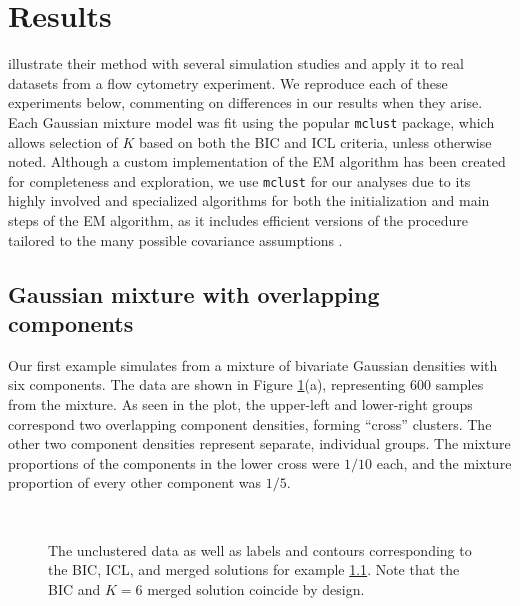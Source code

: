 \documentclass{uwstat572}
\renewcommand\;{\,}
\begin{document}
\section{Results}
\cite{Baudry10} illustrate their method with several simulation studies and apply it to real datasets from a flow cytometry experiment.
We reproduce each of these experiments below, commenting on differences in our results when they arise.
Each Gaussian mixture model was fit using the popular \texttt{mclust} package, which allows selection of $K$ based on both the BIC and ICL criteria, unless otherwise noted.
Although a custom implementation of the EM algorithm has been created for completeness and exploration, we use \texttt{mclust} for our analyses due to its highly involved and specialized algorithms for both the initialization and main steps of the EM algorithm, as it includes efficient versions of the procedure tailored to the many possible covariance assumptions \citep{Scrucca16, Fraley96}.

\subsection{Gaussian mixture with overlapping components}\label{one}
Our first example simulates from a mixture of bivariate Gaussian densities with six components.
The data are shown in Figure \ref{Example1}(a), representing 600 samples from the mixture.
As seen in the plot, the upper-left and lower-right groups correspond two overlapping component densities, forming ``cross'' clusters.
The other two component densities represent separate, individual groups.
The mixture proportions of the components in the lower cross were $1/10$ each, and the mixture proportion of every other component was $1/5$. 

\begin{figure}
\begin{center}
\\
\end{center}
\caption{
The unclustered data as well as labels and contours corresponding to the BIC, ICL, and merged solutions for example \ref{one}. Note that the BIC and $K = 6$ merged solution coincide by design.
}
\label{Example1}
\end{figure}
\end{document}
